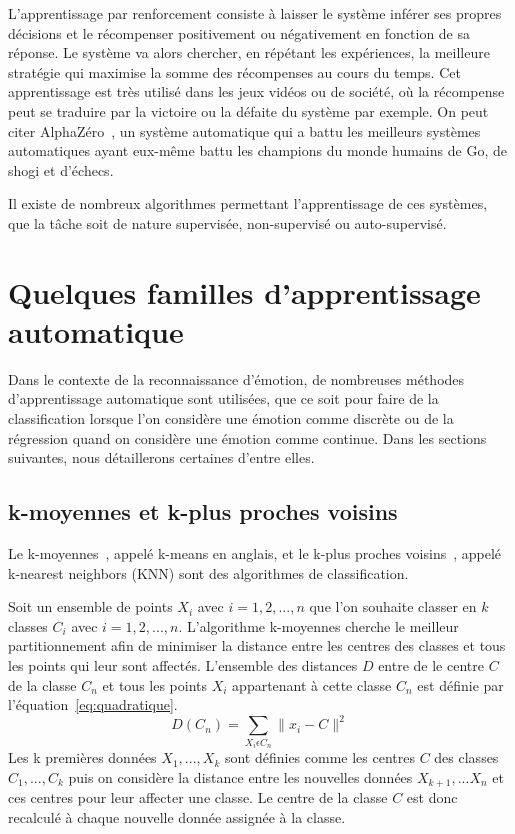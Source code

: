 L'apprentissage par renforcement consiste à laisser le système inférer ses propres décisions et le récompenser positivement ou négativement en fonction de sa réponse. Le système va alors chercher, en répétant les expériences, la meilleure stratégie qui maximise la somme des récompenses au cours du temps. Cet apprentissage est très utilisé dans les jeux vidéos ou de société, où la récompense peut se traduire par la victoire ou la défaite du système par exemple. On peut citer AlphaZéro~\cite{Silver2018}, un système automatique qui a battu les meilleurs systèmes automatiques ayant eux-même battu les champions du monde humains de Go, de shogi et d'échecs.

Il existe de nombreux algorithmes permettant l'apprentissage de ces systèmes, que la tâche soit de nature supervisée, non-supervisé ou auto-supervisé.

\section{Quelques familles d'apprentissage automatique}
Dans le contexte de la reconnaissance d'émotion, de nombreuses méthodes d'apprentissage automatique sont utilisées, que ce soit pour faire de la classification lorsque l'on considère une émotion comme discrète ou de la régression quand on considère une émotion comme continue.
Dans les sections suivantes, nous détaillerons certaines d'entre elles.

\subsection{k-moyennes et k-plus proches voisins}
Le k-moyennes~\cite{Lloyd1982}, appelé k-means en anglais, et le k-plus proches voisins~\cite{Fix1951,Cover1967}, appelé k-nearest neighbors (KNN) sont des algorithmes de classification.

Soit un ensemble de points $X_i$ avec $i=1,2,...,n$ que l'on souhaite classer en $k$ classes $C_i$ avec $i=1,2,...,n$. L’algorithme k-moyennes cherche le meilleur partitionnement afin de minimiser la distance entre les centres des classes et tous les points qui leur sont affectés.
L'ensemble des distances $D$ entre de le centre $C$ de la classe $C_n$ et tous les points $X_i$ appartenant à cette classe $C_n$ est définie par l'équation~\ref{eq:quadratique}.
\begin{equation}
  D(C_n) = \sum_{X_i\epsilon C_n}   \| x_i - C \|^2
  \label{eq:quadratique}
\end{equation}
Les k premières données $X_1,...,X_k$ sont définies comme les centres $C$ des classes $C_1,...,C_k$ puis on considère la distance entre les nouvelles données $X_{k+1},...X_n$ et ces centres pour leur affecter une classe. Le centre de la classe $C$ est donc recalculé à chaque nouvelle donnée assignée à la classe.

